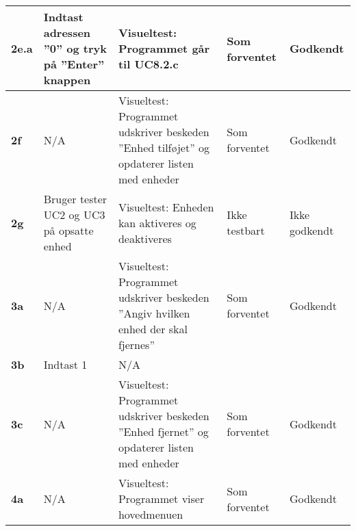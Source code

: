 \begin{center}
\begin{longtable}{|p{}|p{}|p{}|p{}|p{}|}
\textbf{2e.a} &
Indtast adressen ''0'' og tryk på ''Enter'' knappen &
Visueltest: Programmet går til UC8.2.c
&Som \newline forventet 
&Godkendt
 \\\hline

\textbf{2f} &
N/A &
Visueltest: Programmet udskriver beskeden ''Enhed tilføjet'' og opdaterer listen med enheder
&Som \newline forventet 
&Godkendt
 \\\hline

\textbf{2g} &
Bruger tester UC2 og UC3 på opsatte enhed &
Visueltest: Enheden kan aktiveres og deaktiveres
&Ikke \newline testbart 
&Ikke \newline godkendt
 \\\hline

\textbf{3a} &
N/A &
Visueltest: Programmet udskriver beskeden ''Angiv hvilken enhed der skal fjernes''
&Som \newline forventet 
&Godkendt
 \\\hline

\textbf{3b} & 
Indtast 1 &
N/A &
 &\\\hline

\textbf{3c} & 
N/A &
Visueltest: Programmet udskriver beskeden ''Enhed fjernet'' og opdaterer listen med enheder
&Som \newline forventet 
&Godkendt\\\hline

\textbf{4a} & 
N/A &
Visueltest: Programmet viser hovedmenuen
&Som \newline forventet 
&Godkendt\\\hline

	\end{longtable}
	\label{ATUC8} 
\end{center}